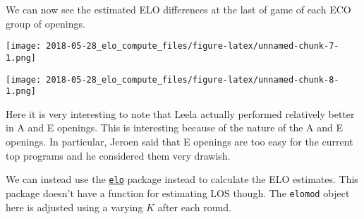 \documentclass[]{article}
\newenvironment{Shaded}{\begin{snugshade}}{\end{snugshade}}
\newcommand{\DecValTok}[1]{\textcolor[rgb]{0.00,0.00,0.81}{#1}}
\newcommand{\KeywordTok}[1]{\textcolor[rgb]{0.13,0.29,0.53}{\textbf{#1}}}
\newcommand{\NormalTok}[1]{#1}
\newcommand{\OperatorTok}[1]{\textcolor[rgb]{0.81,0.36,0.00}{\textbf{#1}}}
\newcommand{\StringTok}[1]{\textcolor[rgb]{0.31,0.60,0.02}{#1}}
\begin{document}
We can now see the estimated ELO differences at the last of game of each
ECO group of openings.

\begin{Shaded}
\end{Shaded}

\texttt{[image: 2018-05-28\_elo\_compute\_files/figure-latex/unnamed-chunk-7-1.png]}

\begin{Shaded}
\end{Shaded}

\texttt{[image: 2018-05-28\_elo\_compute\_files/figure-latex/unnamed-chunk-8-1.png]}

Here it is very interesting to note that Leela actually performed
relatively better in A and E openings. This is interesting because of
the nature of the A and E openings. In particular, Jeroen said that E
openings are too easy for the current top programs and he considered
them very drawish.

We can instead use the
\href{https://CRAN.R-project.org/package=elo}{\texttt{elo}} package
instead to calculate the ELO estimates. This package doesn't have a
function for estimating LOS though. The \texttt{elomod} object here is
adjusted using a varying \(K\) after each round.
\end{document}
